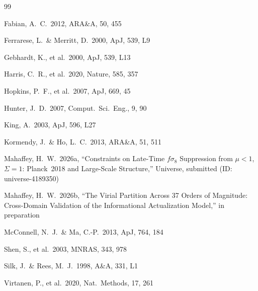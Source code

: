 \documentclass[12pt,a4paper]{article}
\begin{document}
\begin{thebibliography}{99}

 Fabian, A.\ C.\ 2012, ARA\&A, 50, 455

 Ferrarese, L.\ \& Merritt, D.\ 2000, ApJ, 539, L9

 Gebhardt, K., et al.\ 2000, ApJ, 539, L13

 Harris, C.\ R., et al.\ 2020, Nature, 585, 357

 Hopkins, P.\ F., et al.\ 2007, ApJ, 669, 45

 Hunter, J.\ D.\ 2007, Comput.\ Sci.\ Eng., 9, 90

 King, A.\ 2003, ApJ, 596, L27

 Kormendy, J.\ \& Ho, L.\ C.\ 2013, ARA\&A, 51, 511

 Mahaffey, H.\ W.\ 2026a, ``Constraints on Late-Time
$f\sigma_8$ Suppression from $\mu < 1$, $\Sigma = 1$: Planck~2018 and
Large-Scale Structure,'' Universe, submitted (ID: universe-4189350)

 Mahaffey, H.\ W.\ 2026b, ``The Virial Partition Across
37 Orders of Magnitude: Cross-Domain Validation of the Informational Actualization
Model,'' in preparation

 McConnell, N.\ J.\ \& Ma, C.-P.\ 2013, ApJ, 764, 184

 Shen, S., et al.\ 2003, MNRAS, 343, 978

 Silk, J.\ \& Rees, M.\ J.\ 1998, A\&A, 331, L1

 Virtanen, P., et al.\ 2020, Nat.\ Methods, 17, 261

\end{thebibliography}
\end{document}
